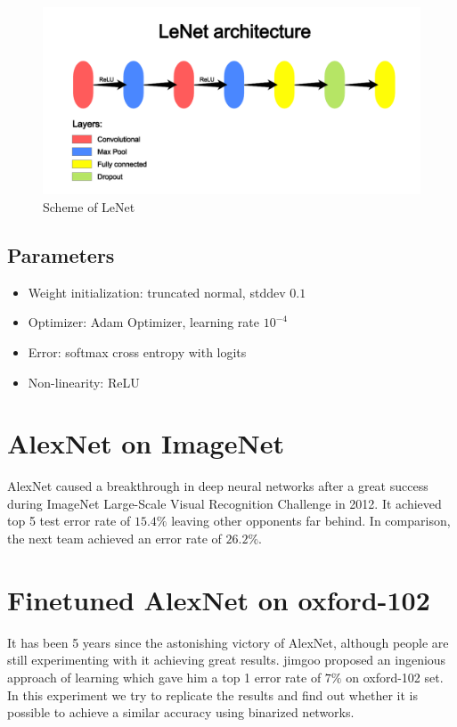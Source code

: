 \documentclass[licencjacka]{pracamgr}
\begin{document}
 			\begin{figure}[h]
				\caption{Scheme of LeNet}
				\label{fig:42}
				\centering
				\includegraphics[width=\textwidth]{LeNet}
			\end{figure}
 		\subsection{Parameters}
 			\begin{itemize}
 			\item Weight initialization: truncated normal, stddev $0.1$
 			\item Optimizer: Adam Optimizer, learning rate $10^{-4}$
 			\item Error: softmax cross entropy with logits
 			\item Non-linearity: ReLU
 			\end{itemize}
 	\section{AlexNet on ImageNet}
 	AlexNet caused a breakthrough in deep neural networks after a great success during ImageNet Large-Scale Visual Recognition Challenge in 2012. It achieved top 5 test error rate of $15.4\%$ leaving other opponents far behind. In comparison, the next team achieved an error rate of $26.2\%$. 
 	\section{Finetuned AlexNet on oxford-102}
 	It has been 5 years since the astonishing victory of AlexNet, although people are still experimenting with it achieving great results. jimgoo \cite{jimgoo} proposed an ingenious approach of learning which gave him a top 1 error rate of $7\%$ on oxford-102 set. In this experiment we try to replicate the results and find out whether it is possible to achieve a similar accuracy using binarized networks. 
\end{document}
